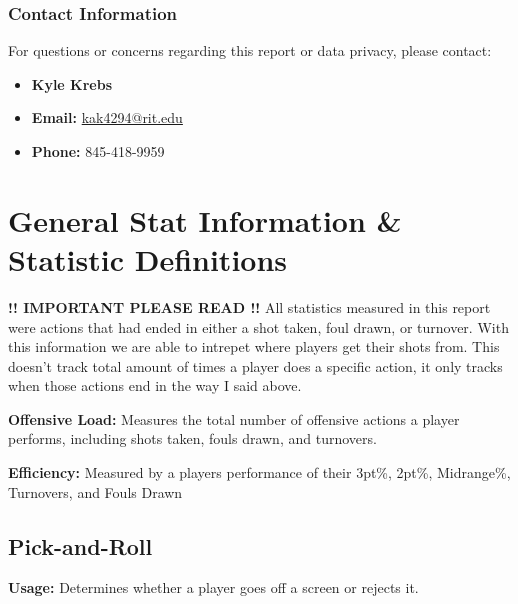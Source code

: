 \documentclass[a4paper,12pt]{article}
\begin{document}
\vspace{0cm} %

\subsubsection*{Contact Information}

For questions or concerns regarding this report or data privacy, please contact:

\begin{itemize}[leftmargin=*, label={}]
    \item \textbf{Kyle Krebs}
    \item \textbf{Email:} \href{mailto:kak4294@rit.edu}{kak4294@rit.edu}
    \item \textbf{Phone:} 845-418-9959
\end{itemize}


\vspace{1.5em}

\small
\section*{General Stat Information \& Statistic Definitions}

    \vspace{1em}
    \noindent \textbf{!! IMPORTANT PLEASE READ !!} All statistics measured in this report were actions that had ended in either a shot taken, foul drawn, or turnover. With this information we are able to intrepet where players get their shots from. This doesn't track total amount of times a player does a specific action, it only tracks when those actions end in the way I said above. 
    \vspace{1em}
    
    \noindent \textbf{Offensive Load:} Measures the total number of offensive actions a player performs, including shots taken, fouls drawn, and turnovers.
    
    \noindent \textbf{Efficiency:} Measured by a players performance of their 3pt\%, 2pt\%, Midrange\%, Turnovers, and Fouls Drawn

\vspace{.3em}


    
\subsection*{Pick-and-Roll}

    \noindent \textbf{Usage:} Determines whether a player goes off a screen or rejects it.
    
\end{document}
